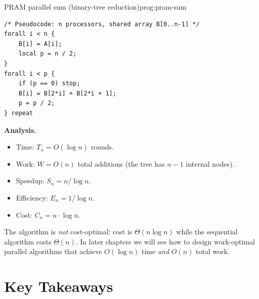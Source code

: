 \begin{ppprogram}{PRAM parallel sum (binary-tree reduction)}{prog:pram-sum}
\begin{lstlisting}[language={}]
/* Pseudocode: n processors, shared array B[0..n-1] */
forall i < n {
    B[i] = A[i];
    local p = n / 2;
}
forall i < p {
    if (p == 0) stop;
    B[i] = B[2*i] + B[2*i + 1];
    p = p / 2;
} repeat
\end{lstlisting}
\end{ppprogram}

\textbf{Analysis.}
\begin{itemize}
  \item Time: $T_n = O(\log n)$ rounds.
  \item Work: $W = O(n)$ total additions (the tree has $n - 1$ internal nodes).
  \item Speedup: $S_n = n / \log n$.
  \item Efficiency: $E_n = 1 / \log n$.
  \item Cost: $C_n = n \cdot \log n$.
\end{itemize}

\begin{pppitfall}
The algorithm is \emph{not} cost-optimal: cost is $\Theta(n \log n)$ while the
sequential algorithm costs $\Theta(n)$. In later chapters we will see how to
design work-optimal parallel algorithms that achieve $O(\log n)$ time
\emph{and} $O(n)$ total work.
\end{pppitfall}

\section{Key Takeaways}

